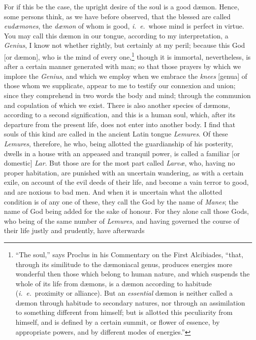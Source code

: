 \documentclass{article}
\begin{document}
\noindent For if this be the case, the upright desire of the soul is a good
d{\ae}mon. Hence, some persons think, as we have before observed, that the
blessed are called \textit{eud{\ae}mones}, the \textit{d{\ae}mon} of whom is
good, \textit{i.~e.}~whose mind is perfect in virtue. You may call this
d{\ae}mon in our tongue, according to my interpretation, a \textit{Genius}, I
know not whether rightly, but certainly at my peril; because this God [or
d{\ae}mon], who is the mind of every one,\footnote{``The soul,'' says Proclus
in his Commentary on the First Alcibiades, ``that, through its
similitude to the d{\ae}moniacal genus, produces energies more wonderful then
those which belong to human nature, and which suspends the whole of its life
from d{\ae}mons, is a d{\ae}mon according to habitude (\textit{i.~e.}~proximity
or alliance). But an \textit{essential} d{\ae}mon is neither called a d{\ae}mon
through habitude to secondary natures, nor through an assimilation to something
different from himself; but is allotted this peculiarity from himself, and is
defined by a certain summit, or flower of essence, by appropriate powers, and
by different modes of energies.''} though it is immortal, nevertheless, is
after a certain manner generated with man; so that those prayers by which we
implore the \textit{Genius}, and which we employ when we embrace the
\textit{knees} [genua] of those whom we supplicate, appear to me to testify our
connexion and union; since they comprehend in two words the body and mind;
through the communion and copulation of which we exist. There is also another
species of d{\ae}mons, according to a second signification, and this is a human
soul, which, after its departure from the present life, does not enter into
another body. I find that souls of this kind are called in the ancient Latin
tongue \textit{Lemures}. Of these \textit{Lemures}, therefore, he who, being
allotted the guardianship of his posterity, dwells in a house with an appeased
and tranquil power, is called a familiar [or domestic] \textit{Lar}. But those
are for the most part called \textit{Larv{\ae}}, who, having no proper
habitation, are punished with an uncertain wandering, as with a certain exile,
on account of the evil deeds of their life, and become a vain terror to good,
and are noxious to bad men. And when it is uncertain what the allotted
condition is of any one of these, they call the God by the name of
\textit{Manes}; the name of God being added for the sake of honour. For they
alone call those Gods, who being of the same number of \textit{Lemures}, and
having governed the course of their life justly and prudently, have afterwards
\end{document}
